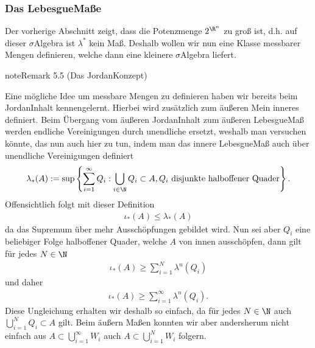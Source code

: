 \documentclass[letterpaper,10pt,english]{jupyterBook}
\begin{document}
\subsubsection{Das Lebesgue\sphinxhyphen{}Maße}
\label{\detokenize{masstheorie/masstheorie:das-lebesgue-masze}}
\sphinxAtStartPar
Der vorherige Abschnitt zeigt, dass die Potenzmenge \(2^{\R^n}\) zu groß ist, d.h. auf dieser \(\sigma\)\sphinxhyphen{}Algebra ist \(\lambda^\ast\) kein Maß. Deshalb wollen wir nun eine Klasse messbarer Mengen definieren, welche dann eine kleinere \(\sigma\)\sphinxhyphen{}Algebra liefert.
\label{masstheorie/masstheorie:remark-31}
\begin{sphinxadmonition}{note}{Remark 5.5 (Das Jordan\sphinxhyphen{}Konzept)}



\sphinxAtStartPar
Eine mögliche Idee um messbare Mengen zu definieren haben wir bereits beim Jordan\sphinxhyphen{}Inhalt kennengelernt. Hierbei wird zusätzlich zum äußeren Mein inneres definiert. Beim Übergang vom äußeren Jordan\sphinxhyphen{}Inhalt zum äußeren Lebesgue\sphinxhyphen{}Maß werden endliche Vereinigungen durch unendliche ersetzt, weshalb man versuchen könnte, das nun auch hier zu tun, indem man das innere Lebesgue\sphinxhyphen{}Maß auch über unendliche Vereinigungen definiert
\begin{equation*}
\begin{split}\lambda_\ast(A) := \sup\left\{\sum_{i=1}^\infty Q_i: \bigcup_{i\in\N} Q_i \subset A, Q_i\text{ disjunkte halboffener Quader}\right\}.\end{split}
\end{equation*}
\sphinxAtStartPar
Offensichtlich folgt mit dieser Definition
\begin{equation*}
\begin{split}\iota_\ast(A)\leq \lambda_\ast(A)\end{split}
\end{equation*}
\sphinxAtStartPar
da das Supremum über mehr Ausschöpfungen gebildet wird. Nun sei aber \(Q_i\) eine beliebiger Folge halboffener Quader, welche \(A\) von innen ausschöpfen, dann gilt für jedes \(N\in\N\)
\begin{equation*}
\begin{split}\iota_\ast(A) \geq \sum_{i=1}^N \lambda^n(Q_i)\end{split}
\end{equation*}
\sphinxAtStartPar
und daher
\begin{equation*}
\begin{split}\iota_\ast(A)\geq \sum_{i=1}^\infty \lambda^n(Q_i).\end{split}
\end{equation*}
\sphinxAtStartPar
Diese Ungleichung erhalten wir deshalb so einfach, da für jedes \(N\in\N\) auch \(\bigcup_{i=1}^N Q_i\subset A\) gilt. Beim äußern Maßen konnten wir aber andersherum nicht einfach aus \(A\subset \bigcup_{i=1}^\infty W_i\) auch \(A\subset \bigcup_{i=1}^N W_i\) folgern.


\end{sphinxadmonition}
\end{document}
